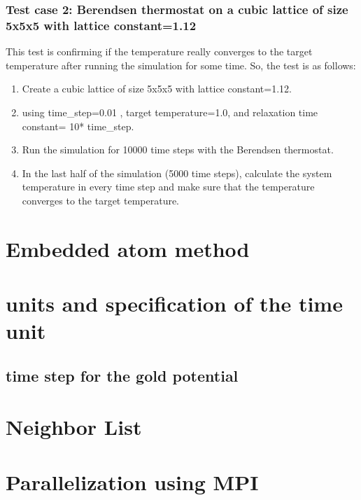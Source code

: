 \subsubsection{Test case 2: Berendsen thermostat on a cubic lattice of size 5x5x5 with lattice constant=1.12}
This test is confirming if the temperature really converges to the target temperature after running the simulation for some time. So, the test is as follows:
\begin{enumerate}
    \item Create a cubic lattice of size 5x5x5 with lattice constant=1.12.
    \item using time\_step=0.01 , target temperature=1.0, and relaxation time constant= 10* time\_step.
    \item Run the simulation for 10000 time steps with the Berendsen thermostat.
    \item In the last half of the simulation (5000 time steps), calculate the system temperature in every time step and make sure that the temperature converges to the target temperature.
\end{enumerate}



\section{Embedded atom method}
\section{units and specification of the time unit}
\subsection{time step for the gold potential}


\section{Neighbor List}

\section{Parallelization using MPI}